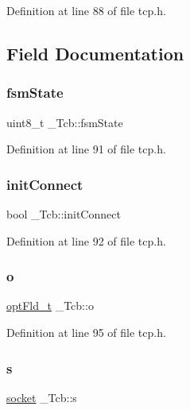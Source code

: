 Definition at line 88 of file tcp.\+h.



\subsection{Field Documentation}
\mbox{\label{struct__Tcb_afaf3e24995780a19fa4ef468cd935dd0}} 
\subsubsection{\texorpdfstring{fsm\+State}{fsmState}}
{\footnotesize\ttfamily uint8\+\_\+t \+\_\+\+Tcb\+::fsm\+State}



Definition at line 91 of file tcp.\+h.

\mbox{\label{struct__Tcb_ac752a140a651bc5b40c5e249a379653f}} 
\subsubsection{\texorpdfstring{init\+Connect}{initConnect}}
{\footnotesize\ttfamily bool \+\_\+\+Tcb\+::init\+Connect}



Definition at line 92 of file tcp.\+h.

\mbox{\label{struct__Tcb_ac32397104bce5cce55db3b8753792435}} 
\subsubsection{\texorpdfstring{o}{o}}
{\footnotesize\ttfamily \hyperlink{structoptFld__t}{opt\+Fld\+\_\+t} \+\_\+\+Tcb\+::o}



Definition at line 95 of file tcp.\+h.

\mbox{\label{struct__Tcb_a5c2b240066167fd6e82cadce2915ba81}} 
\subsubsection{\texorpdfstring{s}{s}}
{\footnotesize\ttfamily \hyperlink{ip_8h_ae41acc846b3288ddd9085d96c8db0496}{socket} \+\_\+\+Tcb\+::s}



